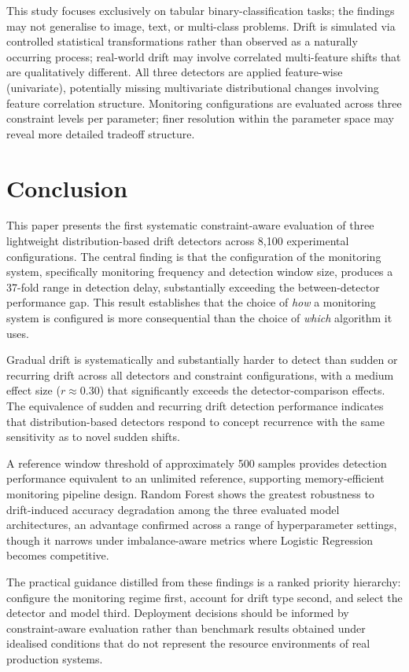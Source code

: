 \documentclass[conference]{IEEEtran}
\begin{document}
This study focuses exclusively on tabular binary-classification tasks; the findings may not generalise to image, text, or multi-class problems. Drift is simulated via controlled statistical transformations rather than observed as a naturally occurring process; real-world drift may involve correlated multi-feature shifts that are qualitatively different. All three detectors are applied feature-wise (univariate), potentially missing multivariate distributional changes involving feature correlation structure. Monitoring configurations are evaluated across three constraint levels per parameter; finer resolution within the parameter space may reveal more detailed tradeoff structure.

\section{Conclusion}

This paper presents the first systematic constraint-aware evaluation of three lightweight distribution-based drift detectors across 8,100 experimental configurations. The central finding is that the configuration of the monitoring system, specifically monitoring frequency and detection window size, produces a 37-fold range in detection delay, substantially exceeding the between-detector performance gap. This result establishes that the choice of \emph{how} a monitoring system is configured is more consequential than the choice of \emph{which} algorithm it uses.

Gradual drift is systematically and substantially harder to detect than sudden or recurring drift across all detectors and constraint configurations, with a medium effect size ($r \approx 0.30$) that significantly exceeds the detector-comparison effects. The equivalence of sudden and recurring drift detection performance indicates that distribution-based detectors respond to concept recurrence with the same sensitivity as to novel sudden shifts.

A reference window threshold of approximately 500 samples provides detection performance equivalent to an unlimited reference, supporting memory-efficient monitoring pipeline design. Random Forest shows the greatest robustness to drift-induced accuracy degradation among the three evaluated model architectures, an advantage confirmed across a range of hyperparameter settings, though it narrows under imbalance-aware metrics where Logistic Regression becomes competitive.

The practical guidance distilled from these findings is a ranked priority hierarchy: configure the monitoring regime first, account for drift type second, and select the detector and model third. Deployment decisions should be informed by constraint-aware evaluation rather than benchmark results obtained under idealised conditions that do not represent the resource environments of real production systems.



\end{document}
